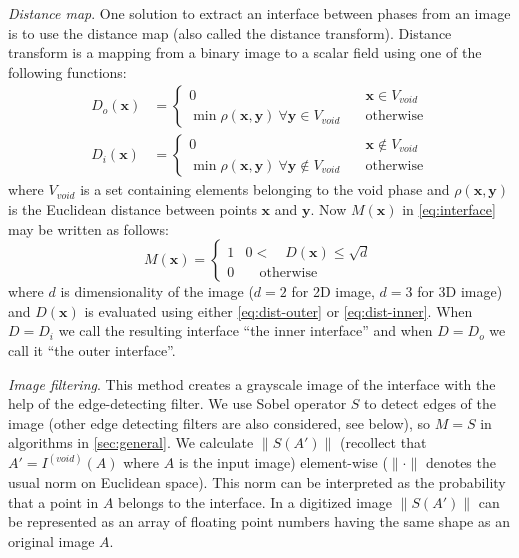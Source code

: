 \documentclass[reprint,amsmath,amssymb,aps,pre,showkeys,showpacs]{revtex4-1}
\begin{document}
\textit{Distance map}.
One solution to extract an interface between phases from an image is to use the
distance map (also called the distance transform). Distance transform is a
mapping from a binary image to a scalar field using one of the following
functions:
\begin{align}
  D_{o}(\mathbf{x}) &= \left\{
  \begin{array}{ll}
    0 & \quad \mathbf{x} \in V_{void} \\
    \min \rho(\mathbf{x}, \mathbf{y}) \ \forall \mathbf{y} \in V_{void} & \quad \text{otherwise}
  \end{array}
  \right. \label{eq:dist-outer} \\
  D_{i}(\mathbf{x}) &= \left\{
  \begin{array}{ll}
    0 & \quad \mathbf{x} \not\in V_{void} \\
    \min \rho(\mathbf{x}, \mathbf{y}) \ \forall \mathbf{y} \not\in V_{void} & \quad \text{otherwise}
  \end{array}
  \right. \label{eq:dist-inner}
\end{align}
where $V_{void}$ is a set containing elements belonging to the void phase and
$\rho(\mathbf{x}, \mathbf{y})$ is the Euclidean distance between points
$\mathbf{x}$ and $\mathbf{y}$. Now $M(\mathbf{x})$ in \cref{eq:interface} may be
written as follows:
\begin{equation*}
  M(\mathbf{x}) = \left\{
  \begin{array}{ll}
    1 & 0 < \quad D(\mathbf{x}) \le \sqrt{d} \\
    0 & \quad \text{otherwise}
  \end{array}
  \right.
\end{equation*}
where $d$ is dimensionality of the image ($d = 2$ for 2D image, $d = 3$ for 3D
image) and $D(\mathbf{x})$ is evaluated using either \cref{eq:dist-outer} or
\cref{eq:dist-inner}. When $D = D_i$ we call the resulting interface
``the inner interface'' and when $D = D_o$ we call it ``the outer interface''.

\textit{Image filtering}.  This method creates a grayscale image of the
interface with the help of the edge-detecting filter. We use Sobel operator $S$
to detect edges of the image (other edge detecting filters are also considered,
see below), so $M = S$ in algorithms in \cref{sec:general}. We calculate
$\|S(A')\|$ (recollect that $A' = I^{(void)}(A)$ where $A$ is the input image)
element-wise ($\|\cdot\|$ denotes the usual norm on Euclidean space). This norm
can be interpreted as the probability that a point in $A$ belongs to the
interface. In a digitized image $\|S(A')\|$ can be represented as an array of
floating point numbers having the same shape as an original image $A$.
\end{document}
